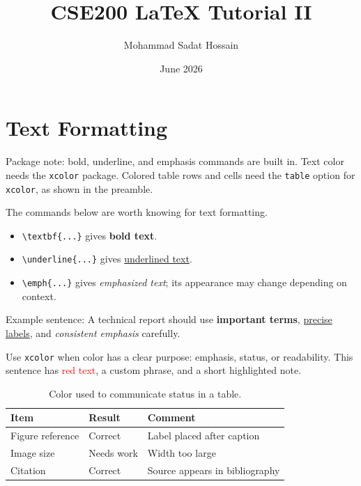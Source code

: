 \documentclass[11pt,a4paper]{article}
\title{CSE200 LaTeX Tutorial II}
\author{Mohammad Sadat Hossain}
\date{June 2026}
\begin{document}
\maketitle

\section{Text Formatting}

Package note: bold, underline, and emphasis commands are built in. Text color
needs the \texttt{xcolor} package. Colored table rows and cells need the
\texttt{table} option for \texttt{xcolor}, as shown in the preamble.

The commands below are worth knowing for text formatting.

\begin{itemize}
    \item \verb|\textbf{...}| gives \textbf{bold text}.
    \item \verb|\underline{...}| gives \underline{underlined text}.
    \item \verb|\emph{...}| gives \emph{emphasized text}; its appearance may
    change depending on context.
\end{itemize}

Example sentence: A technical report should use \textbf{important terms},
\underline{precise labels}, and \emph{consistent emphasis} carefully.

Use \texttt{xcolor} when color has a clear purpose: emphasis, status, or
readability. This sentence has \textcolor{red}{red text},
\textcolor{customblue}{a custom phrase}, and a
\colorbox{softyellow}{short highlighted note}.

\begin{table}[H]
    \centering
    \begin{tabular}{lll}
        \toprule
        Item & Result & Comment \\
        \midrule
        Figure reference & \cellcolor{softgreen}Correct & Label placed after caption \\
        Image size & \cellcolor{softred}Needs work & Width too large \\
        Citation & \cellcolor{softgreen}Correct & Source appears in bibliography \\
        \bottomrule
    \end{tabular}
    \caption{Color used to communicate status in a table.}
    \label{tab:color-status}
\end{table}
\end{document}

